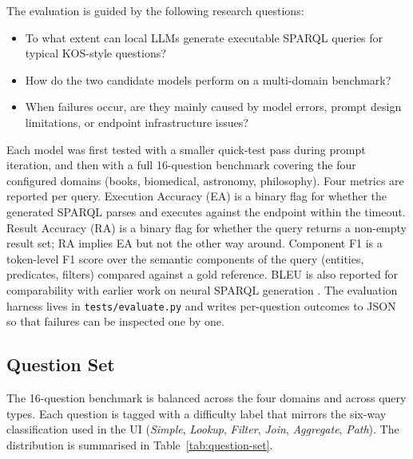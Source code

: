 \documentclass[11pt,a4paper]{article}
\begin{document}
The evaluation is guided by the following research questions:

\begin{itemize}
    \item  To what extent can local LLMs generate executable SPARQL queries for typical KOS-style questions?

    \item  How do the two candidate models perform on a multi-domain benchmark?

    \item  When failures occur, are they mainly caused by model errors, prompt design limitations, or endpoint infrastructure issues?
\end{itemize}

Each model was first tested with a smaller quick-test pass during
prompt iteration, and then with a full 16-question benchmark covering
the four configured domains (books, biomedical, astronomy,
philosophy). Four metrics are reported per query. Execution
Accuracy (EA) is a binary flag for whether the generated SPARQL
parses and executes against the endpoint within the timeout.
Result Accuracy (RA) is a binary flag for whether the query
returns a non-empty result set; RA implies EA but not the other way
around. Component F1 is a token-level F1 score over the
semantic components of the query (entities, predicates, filters)
compared against a gold reference. 
BLEU is also reported for comparability with earlier work on neural SPARQL generation
\cite{yin2021neural}. The evaluation harness lives in
\texttt{tests/evaluate.py} and writes per-question outcomes to JSON
so that failures can be inspected one by one.



\subsection{Question Set}
\label{sec:eval-qset}
The 16-question benchmark is balanced across the four domains and
across query types. Each question is tagged with a difficulty label
that mirrors the six-way classification used in the UI
(\emph{Simple}, \emph{Lookup}, \emph{Filter}, \emph{Join},
\emph{Aggregate}, \emph{Path}). The distribution is summarised in
Table~\ref{tab:question-set}.
\end{document}
